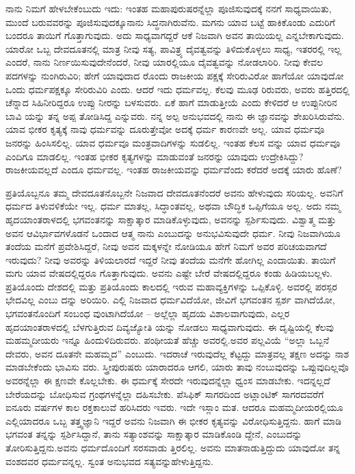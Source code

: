 ನಾನು ನಿಮಗೆ ಹೇಳಬೇಕೆಂಬುದು ಇದು: ಇಂತಹ ಮಹಾಪುರುಷರನ್ನೆಲ್ಲಾ ಪೂಜಿಸುವುದಕ್ಕೆ ನನಗೆ ಸಾಧ್ಯವಾಯಿತು, ಮುಂದೆ ಬರುವವರನ್ನು ಪೂಜಿಸುವುದಕ್ಕೂನಾನು ಸಿದ್ಧನಾಗಿರುವೆನು. ಮಗನು ಯಾವ ಬಟ್ಟೆ ಹಾಕಿಕೊಂಡು ಎದುರಿಗೆ ಬಂದರೂ ತಾಯಿಗೆ ಗೊತ್ತಾಗುವುದು. ಅದು ಸಾಧ್ಯವಾಗದ್ದರೆ ಆಕೆ ನಿಜವಾಗಿ ಅವನ ತಾಯಿಯಲ್ಲ ಎನ್ನಬೇಕಾಗುವುದು. ಯಾರೋ ಒಬ್ಬ ದೇವದೂತನಲ್ಲಿ ಮಾತ್ರ ನೀವು ಸತ್ಯ, ಪಾವಿತ್ರ್ಯ ದೈವತ್ವವನ್ನು ತಿಳಿದುಕೊಳ್ಳಲು ಸಾಧ್ಯ, ಇತರರಲ್ಲಿ ಇಲ್ಲ ಎಂದರೆ, ನಾನು ನಿರ್ಣಯಿಸುವುದೇನೆಂದರೆ, ನೀವು ಯಾರಲ್ಲಿಯೂ ದೈವತ್ವವನ್ನು ನೋಡಲಾರಿರಿ. ನೀವು ಕೇವಲ ಪದಗಳನ್ನು ನುಂಗಿರುವಿರಿ; ಹೇಗೆ ಯಾವುದಾದ ರೊಂದು ರಾಜಕೀಯ ಪಕ್ಷಕ್ಕೆ ಸೇರಿರುವಿರೋ ಹಾಗೆಯೋ ಯಾವುದೋ ಒಂದು ಧರ್ಮಪಕ್ಷಕ್ಕೂ ಸೇರಿರುವಿರಿ ಎಂದು. ಆದರೆ ಇದು ಧರ್ಮವಲ್ಲ. ಕೆಲವು ಮೂಢ ರಿರುವರು, ಅವರು ಹತ್ತಿರದಲ್ಲಿ ಚೆನ್ನಾದ ಸಿಹಿನೀರಿದ್ದರೂ ಉಪ್ಪು ನೀರನ್ನು ಬಳಸುವರು. ಏಕೆ ಹಾಗೆ ಮಾಡುತ್ತೀಯೆ ಎಂದು ಕೇಳಿದರೆ ಆ ಉಪ್ಪುನೀರಿನ ಬಾವಿ ಯನ್ನು ತನ್ನ ಅಪ್ಪ ತೋಡಿಸಿದ್ದ ಎನ್ನುವರು. ನನ್ನ ಅಲ್ಪ ಅನುಭವದಲ್ಲಿ ನಾನು ಈ ಜ್ಞಾನವನ್ನು ಶೇಖರಿಸಿರುವೆನು. ಯಾವ ಭೀಕರ ಕೃತ್ಯಕ್ಕೆ ನಾವು ಧರ್ಮವನ್ನು ದೂರುತ್ತೇವೋ ಅದಕ್ಕೆ ಧರ್ಮ ಕಾರಣವೇ ಅಲ್ಲ. ಯಾವ ಧರ್ಮವೂ ಜನರನ್ನು ಹಿಂಸಿಸಲಿಲ್ಲ. ಯಾವ ಧರ್ಮವೂ ಮಂತ್ರವಾದಿಗಳನ್ನು ಸುಡಲಿಲ್ಲ. ಇಂತಹ ಕೆಲಸ ವನ್ನು ಯಾವ ಧರ್ಮವೂ ಎಂದಿಗೂ ಮಾಡಲಿಲ್ಲ. ಇಂತಹ ಭೀಕರ ಕೃತ್ಯಗಳನ್ನು ಮಾಡುವಂತೆ ಜನರನ್ನು ಯಾವುದು ಉದ್ರೇಕಿಸಿದ್ದು? ರಾಜಕೀಯವಲ್ಲದೆ ಎಂದೂ ಧರ್ಮವಲ್ಲ. ಇಂತಹ ರಾಜಕೀಯವನ್ನು ಧರ್ಮವೆಂದು ಕರೆದರೆ ಅದಕ್ಕೆ ಯಾರು ಹೊಣೆ?

ಪ್ರತಿಯೊಬ್ಬನೂ ತಮ್ಮ ದೇವದೂತನೊಬ್ಬನೇ ನಿಜವಾದ ದೇವದೂತನೆಂದರೆ ಅವನು ಹೇಳುವುದು ಸರಿಯಲ್ಲ. ಅವನಿಗೆ ಧರ್ಮದ ತಿಳುವಳಿಕೆಯೇ ಇಲ್ಲ. ಧರ್ಮ ಮಾತಲ್ಲ, ಸಿದ್ಧಾಂತವಲ್ಲ, ಅಥವಾ ಬೌದ್ಧಿಕ ಒಪ್ಪಿಗೆಯೂ ಅಲ್ಲ. ಅದು ನಮ್ಮ ಹೃದಯಾಂತರಾಳದಲ್ಲಿ ಭಗವಂತನನ್ನು ಸಾಕ್ಷಾತ್ಕಾರ ಮಾಡಿಕೊಳ್ಳುವುದು, ಅವನನ್ನು ಸ್ಪರ್ಶಿಸುವುದು. ವಿಶ್ವಾತ್ಮ ಮತ್ತು ಅವನ ಆವಿರ್ಭಾವಗಳೊಡನೆ ಒಂದಾದ ಆತ್ಮ ನಾನು ಎಂಬುದನ್ನು ಅನುಭವಿಸುವುದೇ ಧರ್ಮ. ನೀವು ನಿಜವಾಗಿಯೂ ತಂದೆಯ ಮನೆಗೆ ಪ್ರವೇಶಿಸಿದ್ದರೆ, ನೀವು ಅವನ ಮಕ್ಕಳನ್ನೇ ನೋಡಿಯೂ ಹೇಗೆ ನಿಮಗೆ ಅವರ ಪರಿಚಯವಾಗದೆ ಇರುವುದು? ನೀವು ಅವರನ್ನು ತಿಳಿಯಲಾರದೆ ಇದ್ದರೆ ನೀವು ತಂದೆಯ ಮನೆಗೇ ಹೋಗಿಲ್ಲ ಎಂದಾಯಿತು. ತಾಯಿಗೆ ಮಗು ಯಾವ ವೇಷದಲ್ಲಿದ್ದರೂ ಗೊತ್ತಾಗುವುದು. ಅವನು ಎಷ್ಟೇ ಬೇರೆ ವೇಷದಲ್ಲಿದ್ದರೂ ಕಂಡು ಹಿಡಿಯಬಲ್ಲಳು. ಪ್ರತಿಯೊಂದು ದೇಶದಲ್ಲಿ ಮತ್ತು ಪ್ರತಿಯೊಂದು ಕಾಲದಲ್ಲಿ ಇರುವ ಮಹಾವ್ಯಕ್ತಿಗಳನ್ನು ಒಪ್ಪಿಕೊಳ್ಳಿ. ಅವರಲ್ಲಿ ಪರಸ್ಪರ ಭೇದವಿಲ್ಲ ಎಂಬು ದನ್ನು ಅರಿಯಿರಿ. ಎಲ್ಲಿ ನಿಜವಾದ ಧರ್ಮವಿದೆಯೋ, ಜೀವಿಗೆ ಭಗವಂತನ ಸ್ಪರ್ಶ ವಾಗಿದೆಯೋ, ಭಗವಂತನೊಂದಿಗೆ ಸಂಬಂಧ ವುಂಟಾಗಿದೆಯೋ – ಅಲ್ಲೆಲ್ಲಾ ಹೃದಯ ವಿಶಾಲವಾಗುವುದು, ಎಲ್ಲರ ಹೃದಯಾಂತರಾಳದಲ್ಲಿ ಬೆಳಗುತ್ತಿರುವ ದಿವ್ಯಜ್ಯೋತಿ ಯನ್ನು ನೋಡಲು ಸಾಧ್ಯವಾಗುವುದು. ಈ ದೃಷ್ಟಿಯಲ್ಲಿ ಕೆಲವು ಮಹಮ್ಮದೀಯರು ಇನ್ನೂ ಹಿಂದುಳಿದಿರುವರು. ಪಂಥೀಯತೆ ಹೆಚ್ಚು ಅವರಲ್ಲಿ.ಅವರ ಪಲ್ಲವಿಯೆ “ಅಲ್ಲಾ ಒಬ್ಬನೆ ದೇವರು, ಅವನ ದೂತನೇ ಮಹಮ್ಮದ” ಎಂಬುದು. ಇದರಾಚೆ ಇರುವುದೆಲ್ಲ ಕೆಟ್ಟದ್ದು ಮಾತ್ರವಲ್ಲ ತಕ್ಷಣ ಅದನ್ನು ನಾಶ ಮಾಡಬೇಕೆಂದು ಭಾವಿಸು ವರು. ಸ್ತ್ರೀಪುರುಷರು ಯಾರಾದರೂ ಆಗಲಿ, ಯಾರು ತಾವು ನಂಬುವುದನ್ನು ಒಪ್ಪುವುದಿಲ್ಲವೊ ಅವರನ್ನೆಲ್ಲಾ ಈ ಕ್ಷಣವೇ ಕೊಲ್ಲಬೇಕು. ಈ ಧರ್ಮಕ್ಕೆ ಸೇರದೇ ಇರುವುದನ್ನೆಲ್ಲಾ ಧ್ವಂಸ ಮಾಡಬೇಕು. ಇದನ್ನಲ್ಲದೆ ಬೇರೆಯದನ್ನು ಬೋಧಿಸುವ ಗ್ರಂಥಗಳನ್ನೆಲ್ಲಾ ದಹಿಸಬೇಕು. ಪೆಸಿಫಿಕ್​ ಸಾಗರದಿಂದ ಅಟ್ಲಾಂಟಿಕ್​ ಸಾಗರದವರೆಗೆ ಐನೂರು ವರ್ಷಗಳ ಕಾಲ ರಕ್ತಕಾಲುವೆ ಹರಿಸಿದರು ಇವರು. ಇದೇ ಇಸ್ಲಾಂ ಮತ. ಆದರೂ ಮಹಮ್ಮದೀಯರಲ್ಲಿಯೂ ಎಲ್ಲಿಯಾದರೂ ಒಬ್ಬ ತತ್ತ್ವಜ್ಞಾನಿ ಇದ್ದರೆ ಅವನು ನಿಜವಾಗಿ ಈ ಭೀಕರ ಕೃತ್ಯವನ್ನು ವಿರೋಧಿಸುತ್ತಿದ್ದನು. ಹಾಗೆ ಮಾಡಿ ಭಗವಂತ ತನ್ನನ್ನು ಸ್ಪರ್ಶಿಸಿದ್ದಾನೆ, ತಾನು ಸತ್ಯಾಂಶವನ್ನು ಸಾಕ್ಷಾತ್ಕಾರ ಮಾಡಿಕೊಂಡಿ ದ್ದೇನೆ, ಎಂಬುದನ್ನು ತೋರಿಸುತ್ತಿದ್ದನು.ಅವನು ಧರ್ಮದೊಂದಿಗೆ ಸರಸವಾಡು ತ್ತಿರಲಿಲ್ಲ. ಅವನು ಮಾತನಾಡುತ್ತಿದ್ದುದು ಯಾವುದೋ ತನ್ನ ವಂಶದವರ ಧರ್ಮವನ್ನಲ್ಲ. ಸ್ವಂತ ಅನುಭವದ ಸತ್ಯವನ್ನುಹೇಳುತ್ತಿದ್ದನು.

